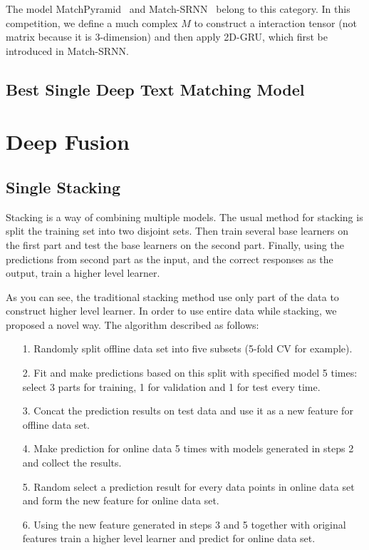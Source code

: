 \documentclass[12pt]{article}
\begin{document}
The model MatchPyramid~\cite{} and Match-SRNN~\cite{} belong to this category. In this competition, we define a much complex $M$ to construct a interaction tensor (not matrix because it is 3-dimension) and then apply 2D-GRU, which first be introduced in Match-SRNN.

\subsection{Best Single Deep Text Matching Model}

\section{Deep Fusion}

\subsection{Single Stacking}
\label{chap:single-stacking}

Stacking is a way of combining multiple models. The usual method for stacking is split the training set into two disjoint sets. Then train several base learners on the first part and test the base learners on the second part. Finally, using the predictions from second part as the input, and the correct responses as the output, train a higher level learner.

As you can see, the traditional stacking method use only part of the data to construct higher level learner. In order to use entire data while stacking, we proposed a novel way. The algorithm described as follows:

\begin{itemize}
\label{alg:single-stacking}
\item[1.] Randomly split offline data set into five subsets (5-fold CV for example).
\item[2.] Fit and make predictions based on this split with specified model 5 times: select 3 parts for training, 1 for validation and 1 for test every time.
\item[3.] Concat the prediction results on test data and use it as a new feature for offline data set.
\item[4.] Make prediction for online data 5 times with models generated in steps 2 and collect the results.
\item[5.] Random select a prediction result for every data points in online data set and form the new feature for online data set.
\item[6.] Using the new feature generated in steps 3 and 5 together with original features train a higher level learner and predict for online data set.
\end{itemize}
\end{document}
